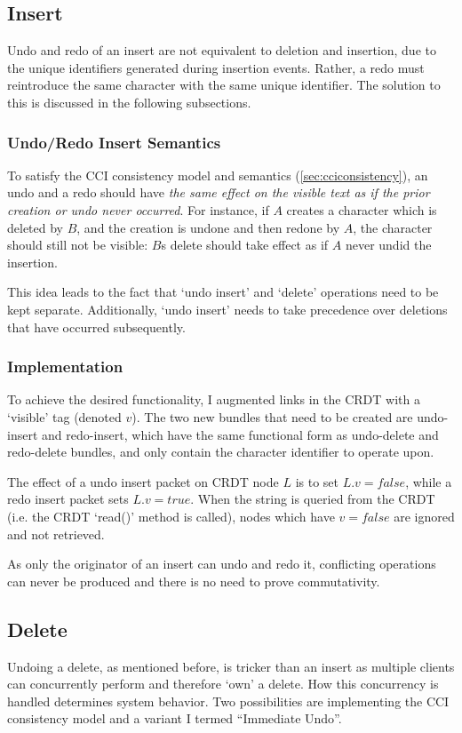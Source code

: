 \documentclass[12pt,a4paper,twoside,openright]{report}
\begin{document}
	
	\subsection{Insert}
	Undo and redo of an insert are not equivalent to deletion and insertion, due to the unique identifiers generated during insertion events. Rather, a redo must reintroduce the same character with the same unique identifier. The solution to this is discussed in the following subsections.
	
		\subsubsection{Undo/Redo Insert Semantics}
		To satisfy the CCI consistency model and semantics (\cref{sec:cciconsistency}), an undo and a redo should have \textit{the same effect on the visible text as if the prior creation or undo never occurred}. For instance, if $A$ creates a character which is deleted by $B$, and the creation is undone and then redone by $A$, the character should still not be visible: $B$s delete should take effect as if $A$ never undid the insertion.
		
		This idea leads to the fact that `undo insert' and `delete' operations need to be kept separate. Additionally, `undo insert' needs to take precedence over deletions that have occurred subsequently.
		
		\subsubsection{Implementation}
		
		To achieve the desired functionality, I augmented links in the CRDT with a `visible' tag (denoted $v$). The two new bundles that need to be created are undo-insert and redo-insert, which have the same functional form as undo-delete and redo-delete bundles, and only contain the character identifier to operate upon.
		
		The effect of a undo insert packet on CRDT node $L$ is to set $L.v = false$, while a redo insert packet sets $L.v = true$. When the string is queried from the CRDT (i.e. the CRDT `read()' method is called), nodes which have $v = false$ are ignored and not retrieved.
		
		As only the originator of an insert can undo and redo it, conflicting operations can never be produced and there is no need to prove commutativity.
		
	\subsection{Delete}
		Undoing a delete, as mentioned before, is tricker than an insert as multiple clients can concurrently perform and therefore `own' a delete. How this concurrency is handled determines system behavior. Two possibilities are implementing the CCI consistency model and a variant I termed ``Immediate Undo''.
		
\end{document}
